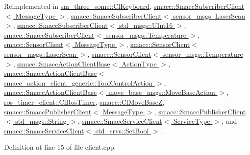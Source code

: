 Reimplemented in \hyperlink{classsm__three__some_1_1ClKeyboard_adbc06c9dc3a4a5b266ff70a4300dcdeb}{sm\+\_\+three\+\_\+some\+::\+Cl\+Keyboard}, \hyperlink{classsmacc_1_1SmaccSubscriberClient_acfa97685ecc588fe61eb57002354b58a}{smacc\+::\+Smacc\+Subscriber\+Client$<$ Message\+Type $>$}, \hyperlink{classsmacc_1_1SmaccSubscriberClient_acfa97685ecc588fe61eb57002354b58a}{smacc\+::\+Smacc\+Subscriber\+Client$<$ sensor\+\_\+msgs\+::\+Laser\+Scan $>$}, \hyperlink{classsmacc_1_1SmaccSubscriberClient_acfa97685ecc588fe61eb57002354b58a}{smacc\+::\+Smacc\+Subscriber\+Client$<$ std\+\_\+msgs\+::\+U\+Int16 $>$}, \hyperlink{classsmacc_1_1SmaccSubscriberClient_acfa97685ecc588fe61eb57002354b58a}{smacc\+::\+Smacc\+Subscriber\+Client$<$ sensor\+\_\+msgs\+::\+Temperature $>$}, \hyperlink{classsmacc_1_1SensorClient_aab9ae52c239305f09cfc4aa48e533ef8}{smacc\+::\+Sensor\+Client$<$ Message\+Type $>$}, \hyperlink{classsmacc_1_1SensorClient_aab9ae52c239305f09cfc4aa48e533ef8}{smacc\+::\+Sensor\+Client$<$ sensor\+\_\+msgs\+::\+Laser\+Scan $>$}, \hyperlink{classsmacc_1_1SensorClient_aab9ae52c239305f09cfc4aa48e533ef8}{smacc\+::\+Sensor\+Client$<$ sensor\+\_\+msgs\+::\+Temperature $>$}, \hyperlink{classsmacc_1_1SmaccActionClientBase_a0224d7482b50a706f99bd280495ef1af}{smacc\+::\+Smacc\+Action\+Client\+Base$<$ Action\+Type $>$}, \hyperlink{classsmacc_1_1SmaccActionClientBase_a0224d7482b50a706f99bd280495ef1af}{smacc\+::\+Smacc\+Action\+Client\+Base$<$ smacc\+\_\+action\+\_\+client\+\_\+generic\+::\+Tool\+Control\+Action $>$}, \hyperlink{classsmacc_1_1SmaccActionClientBase_a0224d7482b50a706f99bd280495ef1af}{smacc\+::\+Smacc\+Action\+Client\+Base$<$ move\+\_\+base\+\_\+msgs\+::\+Move\+Base\+Action $>$}, \hyperlink{classros__timer__client_1_1ClRosTimer_a2d290d2a5d0afa7cdab543b17dbddbff}{ros\+\_\+timer\+\_\+client\+::\+Cl\+Ros\+Timer}, \hyperlink{classsmacc_1_1ClMoveBaseZ_a0eb8e4a0e80456fa534bbef7b2e330a5}{smacc\+::\+Cl\+Move\+BaseZ}, \hyperlink{classsmacc_1_1SmaccPublisherClient_ac1b9a683a411f4957411fcbdb3980233}{smacc\+::\+Smacc\+Publisher\+Client$<$ Message\+Type $>$}, \hyperlink{classsmacc_1_1SmaccPublisherClient_ac1b9a683a411f4957411fcbdb3980233}{smacc\+::\+Smacc\+Publisher\+Client$<$ std\+\_\+msgs\+::\+String $>$}, \hyperlink{classsmacc_1_1SmaccServiceClient_a9ac26f1ca1e661e6b393ce7605166bdc}{smacc\+::\+Smacc\+Service\+Client$<$ Service\+Type $>$}, and \hyperlink{classsmacc_1_1SmaccServiceClient_a9ac26f1ca1e661e6b393ce7605166bdc}{smacc\+::\+Smacc\+Service\+Client$<$ std\+\_\+srvs\+::\+Set\+Bool $>$}.



Definition at line 15 of file client.\+cpp.


